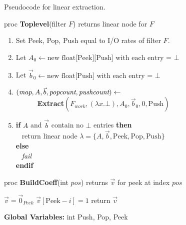 \begin{algorithm}
\caption{Pseudocode for linear extraction.\protect\label{alg:dataflow}}
proc {\bf Toplevel}(filter $F$) returns linear node for $F$
\begin{enumerate}
\item Set Peek, Pop, Push equal to I/O rates of filter $F$.
\item Let $A_{0} \leftarrow \mbox{new float[Peek][Push] with each entry =~} \bot$
\item Let ${\vec b_{0}} \leftarrow \mbox{new float[Push] with each entry =~} \bot$
\item $(\mbox{\it map}, A, {\vec b}, \mbox{\it popcount}, \mbox{\it pushcount}) \leftarrow$ \\
\verb+      +{\bf Extract}$(F_{work}, (\lambda x . \bot), A_{0}, {\vec b_{0}}, 0, \mbox{Push})$
\item {\bf if} $A$ and ${\vec b}$ contain no $\bot$ entries {\bf then} \\
\verb+ + return linear node $\lambda = \{A, {\vec b}, \mbox{Peek}, \mbox{Pop}, \mbox{Push}\}$ \\
 {\bf else} \\
\verb+ + {\it fail} \\
 {\bf endif}
\end{enumerate}
proc {\bf BuildCoeff}(int $pos$) returns $\vec v$ for peek at index $pos$ \\ \vspace{-12pt}
\begin{algorithmic}
\STATE $\vec v = \vec 0_{Peek}$
\STATE $\vec v[\mbox{Peek}-i] = 1$
\STATE return $\vec v$
\end{algorithmic}
\vspace{6pt}
{\bf Global Variables:} int Push, Pop, Peek
\end{algorithm}

